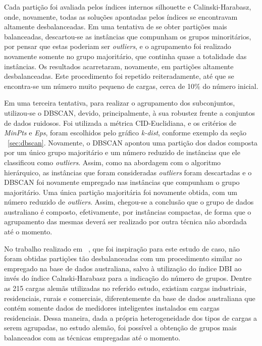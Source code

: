 Cada partição foi avaliada pelos índices internos silhouette e Calinski-Harabasz, onde, novamente, todas as soluções apontadas pelos índices se encontravam altamente desbalanceadas.  Em uma tentativa de se obter partições mais balanceadas, descartou-se as instâncias que compunham os grupos minoritários, por pensar que estas poderiam ser \emph{outliers}, e o agrupamento foi realizado novamente somente no grupo majoritário, que continha quase a totalidade das instâncias. Os resultados acarretaram, novamente, em partições altamente desbalanceadas. Este procedimento foi repetido reiteradamente, até que se encontra-se um número muito pequeno de cargas, cerca de 10\% do número inicial.

Em uma terceira tentativa, para realizar o agrupamento dos subconjuntos, utilizou-se o DBSCAN, devido, principalmente, à sua robustez frente a conjuntos de dados ruidosos. Foi utilizada a métrica CID-Euclidiana, e os critérios de \emph{MinPts} e \emph{Eps}, foram escolhidos pelo gráfico \emph{k-dist}, conforme exemplo da seção ~\ref{sec:dbscan}. Novamente, o DBSCAN apontou uma partição dos dados composta por um único grupo majoritário e um número reduzido de instâncias que ele classificou como \emph{outliers}. Assim, como na abordagem com o algoritmo hierárquico, as instâncias que foram consideradas \emph{outliers} foram descartadas e o DBSCAN foi novamente empregado nas instâncias que compunham o grupo majoritário. Uma única partição majoritária foi novamente obtida, com um número reduzido de \emph{outliers}. Assim, chegou-se a conclusão que o grupo de dados australiano é composto, efetivamente, por instâncias compactas, de forma que o agrupamento das mesmas deverá ser realizado por outra técnica não abordada até o momento.

No trabalho realizado em ~\parencite{Flath2012}, que foi inspiração para este estudo de caso, não foram obtidas partições tão desbalanceadas  com um procedimento similar ao empregado na base de dados australiana, salvo à utilização do índice DBI ao invés do índice Calnski-Harabasz para a indicação do número de grupos. Dentre as 215 cargas alemãs utilizadas no referido estudo, existiam cargas industriais, residenciais, rurais e comerciais, diferentemente da base de dados australiana que contém somente dados de medidores inteligentes instalados em cargas residenciais. Dessa maneira, dada a própria heterogeneidade dos tipos de cargas a serem agrupadas, no estudo alemão, foi possível a obtenção de grupos mais balanceados com as técnicas empregadas até o momento.

